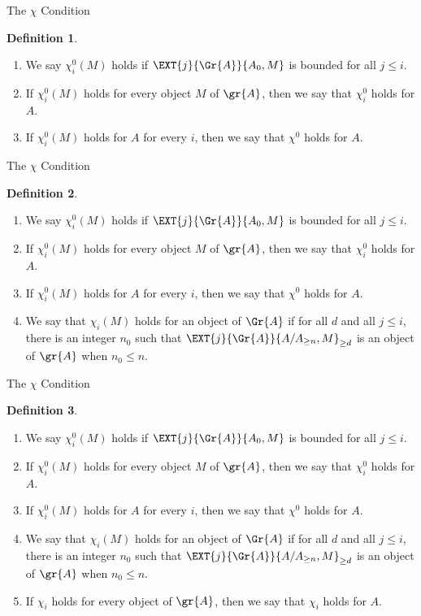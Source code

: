 \documentclass{beamer}
\theoremstyle{definition}
\newtheorem{defn}{Definition}
\begin{document}
\begin{frame}{The $\chi$ Condition}
  \setcounter{defn}{6}
  \begin{defn}
    \begin{enumerate}
    \item
      We say $\chi_i^0(M)$ holds if $\EXT{j}{\Gr{A}}{A_0, M}$ is bounded for all $j \leq i$.
    \item
      If $\chi^0_i(M)$ holds for every object $M$ of $\gr{A}$, then we say that $\chi^0_i$ holds for $A$.
    \item
      If $\chi^0_i(M)$ holds for $A$ for every $i$, then we say that $\chi^0$ holds for $A$.
    \end{enumerate}
  \end{defn}
\end{frame}

\begin{frame}{The $\chi$ Condition}
  \setcounter{defn}{6}
  \begin{defn}
    \begin{enumerate}
    \item
      We say $\chi_i^0(M)$ holds if $\EXT{j}{\Gr{A}}{A_0, M}$ is bounded for all $j \leq i$.
    \item
      If $\chi^0_i(M)$ holds for every object $M$ of $\gr{A}$, then we say that $\chi^0_i$ holds for $A$.
    \item
      If $\chi^0_i(M)$ holds for $A$ for every $i$, then we say that $\chi^0$ holds for $A$.
    \item
      We say that $\chi_i(M)$ holds for an object of $\Gr{A}$ if for all $d$ and all $j \leq i$, there is an integer $n_0$ such that $\EXT{j}{\Gr{A}}{A/A_{\geq n}, M}_{\geq d}$ is an object of $\gr{A}$ when $n_0 \leq n$.
    \end{enumerate}
  \end{defn}
\end{frame}

\begin{frame}{The $\chi$ Condition}
  \setcounter{defn}{6}
  \begin{defn}
    \begin{enumerate}
    \item
      We say $\chi_i^0(M)$ holds if $\EXT{j}{\Gr{A}}{A_0, M}$ is bounded for all $j \leq i$.
    \item
      If $\chi^0_i(M)$ holds for every object $M$ of $\gr{A}$, then we say that $\chi^0_i$ holds for $A$.
    \item
      If $\chi^0_i(M)$ holds for $A$ for every $i$, then we say that $\chi^0$ holds for $A$.
    \item
      We say that $\chi_i(M)$ holds for an object of $\Gr{A}$ if for all $d$ and all $j \leq i$, there is an integer $n_0$ such that $\EXT{j}{\Gr{A}}{A/A_{\geq n}, M}_{\geq d}$ is an object of $\gr{A}$ when $n_0 \leq n$.
    \item
      If $\chi_i$ holds for every object of $\gr{A}$, then we say that $\chi_i$ holds for $A$.
    \end{enumerate}
  \end{defn}
\end{frame}
\end{document}

